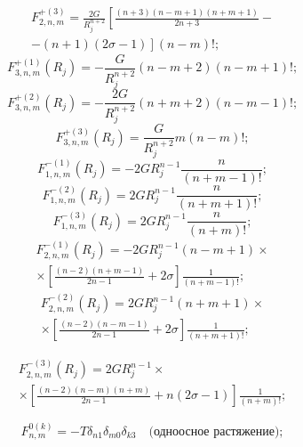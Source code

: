 \begin{multline}
F_{2,n,m}^{ + (3)} = \frac{{2G}}{{{R_j^{n + 2}}}}\left[ {\frac{{(n + 3)(n - m + 1)(n + m + 1)}}{{2n + 3}} - } \right.\\
\left. { - (n + 1)(2\sigma  - 1)} \right](n - m)!;
\label{eq:8:14a}
\end{multline}
\begin{equation}
F_{3,n,m}^{ + (1)}(R_j) =  - \frac{G}{{{R_j^{n + 2}}}}(n - m + 2)(n - m + 1)!;
\label{eq:8:14b}
\end{equation}
\begin{equation}
F_{3,n,m}^{ + (2)}(R_j) =  - \frac{{2G}}{{{R_j^{n + 2}}}}(n + m + 2)(n - m - 1)!;
\label{eq:8:15a}
\end{equation}
\begin{equation}
F_{3,n,m}^{ + (3)}(R_j) = \frac{G}{R_j^{n+2}}m(n - m)!;
\label{eq:8:15b}
\end{equation}
\begin{equation}
F_{1,n,m}^{ - (1)}(R_j) =  - 2G{R_j^{n - 1}}\frac{n}{{(n + m - 1)!}};
\label{eq:8:16a}
\end{equation}
\begin{equation}
F_{1,n,m}^{ - (2)}(R_j) = 2G{R_j^{n - 1}}\frac{n}{{(n + m + 1)!}};
\label{eq:8:16b}
\end{equation}
\begin{equation}
F_{1,n,m}^{ - (3)}(R_j) = 2G{R_j^{n - 1}}\frac{n}{{(n + m)!}};
\label{eq:8:17a}
\end{equation}
\begin{multline}
F_{2,n,m}^{ - (1)}(R_j) =  - 2G{R_j^{n - 1}}(n - m + 1) \times \\
\times \left[ {\frac{{(n - 2)(n + m - 1)}}{{2n - 1}} + 2\sigma } \right]\frac{1}{{(n + m - 1)!}};
\label{eq:8:17b}
\end{multline}
\begin{multline}
F_{2,n,m}^{ - (2)}(R_j) = 2G{R_j^{n - 1}}(n + m + 1)\times \\
\times\left[ {\frac{{(n - 2)(n - m - 1)}}{{2n - 1}} + 2\sigma } \right]\frac{1}{{(n + m + 1)!}};
\label{eq:8:17c}
\end{multline}

\begin{multline}
F_{2,n,m}^{ - (3)}(R_j) = 2G{R_j^{n - 1}}\times \\
\times\left[ {\frac{{(n - 2)(n - m)(n + m)}}{{2n - 1}} + n(2\sigma  - 1)} \right]\frac{1}{{(n + m)!}};
\label{eq:8:18}
\end{multline}

\begin{equation}
F_{n,m}^{0(k)} =  - T{\delta _{n1}}{\delta _{m0}}{\delta _{k3}}\quad\text{(одноосное растяжение)};
\label{eq:8:19}
\end{equation}

